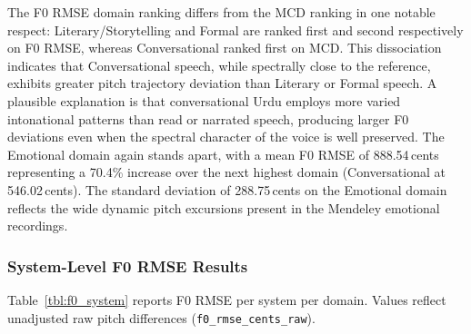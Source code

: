 \documentclass[a4paper,fleqn]{cas-dc}
\begin{document}
    \hspace*{1.2em} The F0 RMSE domain ranking differs from the MCD ranking in one notable
    respect: Literary/Storytelling and Formal are ranked first and second
    respectively on F0 RMSE, whereas Conversational ranked first on MCD.
    This dissociation indicates that Conversational speech, while spectrally
    close to the reference, exhibits greater pitch trajectory deviation than
    Literary or Formal speech. A plausible explanation is that conversational
    Urdu employs more varied intonational patterns than read or narrated speech,
    producing larger F0 deviations even when the spectral character of the
    voice is well preserved. The Emotional domain again stands apart, with a
    mean F0 RMSE of 888.54\,cents representing a 70.4\% increase over the
    next highest domain (Conversational at 546.02\,cents). The standard
    deviation of 288.75\,cents on the Emotional domain reflects the wide dynamic
    pitch excursions present in the Mendeley emotional recordings.
    
    \subsubsection{System-Level F0 RMSE Results}
    
    \hspace*{1.2em} Table~\ref{tbl:f0_system} reports F0 RMSE per system per domain.
    Values reflect unadjusted raw pitch differences (\texttt{f0\_rmse\_cents\_raw}).
\end{document}
